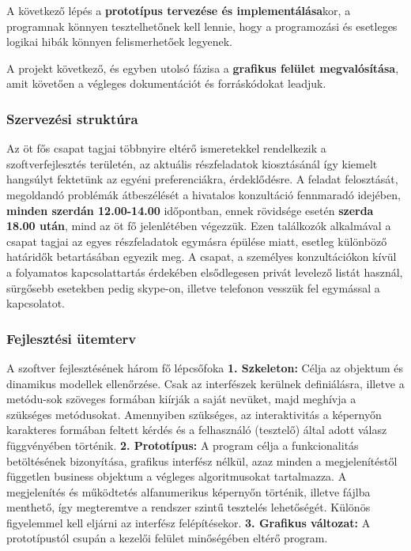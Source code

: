 	A következő lépés a \textbf{prototípus tervezése és implementálása}kor, a programnak könnyen tesztelhetőnek kell lennie, hogy a programozási és esetleges logikai hibák könnyen felismerhetőek legyenek.
	
	A projekt következő, és egyben utolsó fázisa a \textbf{grafikus felület megvalósítása}, amit követően a végleges dokumentációt és forráskódokat leadjuk.
	
\subsubsection{Szervezési struktúra}
	Az öt fős csapat tagjai többnyire eltérő ismeretekkel rendelkezik a szoftverfejlesztés területén, az aktuális részfeladatok kiosztásánál így kiemelt hangsúlyt fektetünk az egyéni preferenciákra, érdeklődésre. A feladat felosztását, megoldandó problémák átbeszélését a hivatalos konzultáció fennmaradó idejében,\textbf{ minden szerdán 12.00-14.00} időpontban, ennek rövidsége esetén \textbf{szerda 18.00 után}, mind az öt fő jelenlétében végezzük. Ezen találkozók alkalmával a csapat tagjai az egyes részfeladatok egymásra épülése miatt, esetleg különböző határidők betartásában egyezik meg.
	A csapat, a személyes konzultációkon kívül a folyamatos kapcsolattartás érdekében elsődlegesen privát levelező listát használ, sürgősebb esetekben pedig skype-on, illetve telefonon vesszük fel egymással a kapcsolatot.
	
\subsubsection{Fejlesztési ütemterv}
A szoftver fejlesztésének három fő lépcsőfoka
	\textbf{1. Szkeleton:} Célja az objektum és dinamikus modellek ellenőrzése. Csak az interfészek kerülnek definiálásra, illetve a metódu-sok szöveges formában kiírják a saját nevüket, majd meghívja a szükséges metódusokat. Amennyiben szükséges, az interaktivitás a képernyőn karakteres formában feltett kérdés és a felhasználó (tesztelő) által adott válasz függvényében történik.
	\textbf{2. Prototípus:} A program célja a funkcionalitás betöltésének bizonyítása, grafikus interfész nélkül, azaz minden  a megjelenítéstől független business objektum a végleges algoritmusokat tartalmazza. A megjelenítés és működtetés alfanumerikus képernyőn történik, illetve fájlba menthető, így megteremtve a rendszer szintű tesztelés lehetőségét. Különös figyelemmel kell eljárni az interfész felépítésekor.
	\textbf{3. Grafikus változat:} A prototípustól csupán a kezelői felület minőségében eltérő program.

